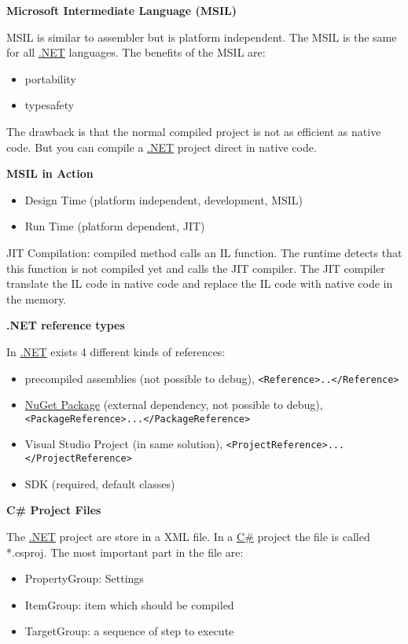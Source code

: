 \documentclass[11pt,twoside,landscape]{article}
\begin{document}
\begin{multicols}{3}
\textbf{Microsoft Intermediate Language (MSIL)}

MSIL is similar to assembler but is platform independent.
The MSIL is the same for all \href{../../../roam/20211003114703-net.org}{.NET} languages.
The benefits of the MSIL are:
\begin{itemize}
\item portability
\item typesafety
\end{itemize}

The drawback is that the normal compiled project is not as efficient as native code.
But you can compile a \href{../../../roam/20211003114703-net.org}{.NET} project direct in native code.

\textbf{MSIL in Action}

\begin{itemize}
\item Design Time (platform independent, development, MSIL)
\item Run Time (platform dependent, JIT)
\end{itemize}

JIT Compilation:
compiled method calls an IL function.
The runtime detects that this function is not compiled yet and calls the JIT compiler.
The JIT compiler translate the IL code in native code and replace the IL code with native code in the memory.

\textbf{.NET reference types}

In \href{../../../roam/20211003114703-net.org}{.NET} exists 4 different kinds of references:
\begin{itemize}
\item precompiled assemblies (not possible to debug), \texttt{<Reference>..</Reference>}
\item \href{../../../roam/20211003140935-nuget_package.org}{NuGet Package} (external dependency, not possible to debug), \texttt{<PackageReference>...</PackageReference>}
\item Visual Studio Project (in same solution), \texttt{<ProjectReference>...</ProjectReference>}
\item SDK (required, default classes)
\end{itemize}


\textbf{C\# Project Files}

The \href{../../../roam/20211003114703-net.org}{.NET} project are store in a XML file.
In a \href{../../../roam/20211003114158-c.org}{C\#} project the file is called *.csproj.
The most important part in the file are:
\begin{itemize}
\item PropertyGroup: Settings
\item ItemGroup: item which should be compiled
\item TargetGroup: a sequence of step to execute
\end{itemize}



\end{multicols}
\end{document}
